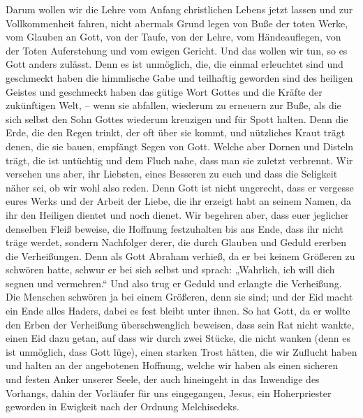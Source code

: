  Darum wollen wir die Lehre vom Anfang christlichen Lebens
jetzt lassen und zur Vollkommenheit fahren, nicht abermals Grund legen
von Buße der toten Werke, vom Glauben an Gott,  von der
Taufe, von der Lehre, vom Händeauflegen, von der Toten Auferstehung und
vom ewigen Gericht.  Und das wollen wir tun, so es Gott
anders zulässt.  Denn es ist unmöglich, die, die einmal
erleuchtet sind und geschmeckt haben die himmlische Gabe und teilhaftig
geworden sind des heiligen Geistes  und geschmeckt haben
das gütige Wort Gottes und die Kräfte der zukünftigen Welt, --
 wenn sie abfallen, wiederum zu erneuern zur Buße, als die
sich selbst den Sohn Gottes wiederum kreuzigen und für Spott halten.
 Denn die Erde, die den Regen trinkt, der oft über sie
kommt, und nützliches Kraut trägt denen, die sie bauen, empfängt Segen
von Gott.  Welche aber Dornen und Disteln trägt, die ist
untüchtig und dem Fluch nahe, dass man sie zuletzt verbrennt.
 Wir versehen uns aber, ihr Liebsten, eines Besseren zu
euch und dass die Seligkeit näher sei, ob wir wohl also reden.
 Denn Gott ist nicht ungerecht, dass er vergesse eures
Werks und der Arbeit der Liebe, die ihr erzeigt habt an seinem Namen, da
ihr den Heiligen dientet und noch dienet.  Wir begehren
aber, dass euer jeglicher denselben Fleiß beweise, die Hoffnung
festzuhalten bis ans Ende,  dass ihr nicht träge werdet,
sondern Nachfolger derer, die durch Glauben und Geduld ererben die
Verheißungen.  Denn als Gott Abraham verhieß, da er bei
keinem Größeren zu schwören hatte, schwur er bei sich selbst
 und sprach: „Wahrlich, ich will dich segnen und
vermehren.``  Und also trug er Geduld und erlangte die
Verheißung.  Die Menschen schwören ja bei einem Größeren,
denn sie sind; und der Eid macht ein Ende alles Haders, dabei es fest
bleibt unter ihnen.  So hat Gott, da er wollte den Erben
der Verheißung überschwenglich beweisen, dass sein Rat nicht wankte,
einen Eid dazu getan,  auf dass wir durch zwei Stücke,
die nicht wanken (denn es ist unmöglich, dass Gott lüge), einen starken
Trost hätten, die wir Zuflucht haben und halten an der angebotenen
Hoffnung,  welche wir haben als einen sicheren und festen
Anker unserer Seele, der auch hineingeht in das Inwendige des Vorhangs,
 dahin der Vorläufer für uns eingegangen, Jesus, ein
Hoherpriester geworden in Ewigkeit nach der Ordnung Melchisedeks.

